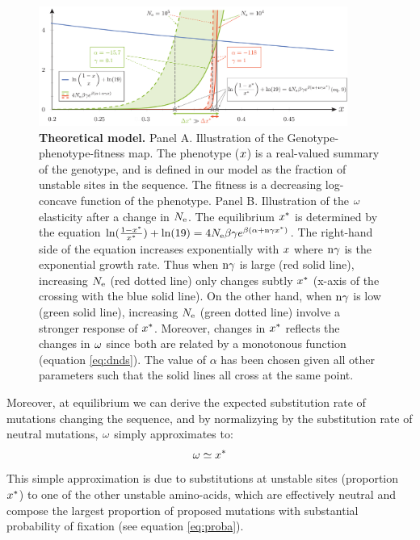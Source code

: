 \documentclass{article}
\begin{document}
\begin{figure}[htb!]
	\begin{mdframed}
		\centering
		\includegraphics[width=0.9\textwidth, page=1] {artworks/theoretical.pdf}
		\caption{
			\textbf{Theoretical model.}
			Panel A. Illustration of the Genotype-phenotype-fitness map. The phenotype ($x$) is a real-valued summary of the genotype, and is defined in our model as the fraction of unstable sites in the sequence. The fitness is a decreasing log-concave function of the phenotype.
			Panel B. Illustration of the $\omega$ elasticity after a change in $N_{\mathrm{e}}$. The equilibrium $x^{*}$ is determined by the equation $\ln(\frac{1 - x^{*}}{x^{*}}) + \ln(19)=4N_{\mathrm{e}} \beta \gamma e^{\beta (\alpha + \text{n} \gamma x^{*})}$. The right-hand side of the equation increases exponentially with $x$ where $\text{n} \gamma$ is the exponential growth rate. Thus when $\text{n} \gamma$ is large (red solid line), increasing $N_{\mathrm{e}}$ (red dotted line) only changes subtly $x^{*}$ (x-axis of the crossing with the blue solid line). On the other hand, when $\text{n} \gamma$ is low (green solid line), increasing $N_{\mathrm{e}}$ (green dotted line) involve a stronger response of $x^{*}$. Moreover, changes in $x^{*}$ reflects the changes in $\omega$ since both are related by a monotonous function (equation \ref{eq:dnds}). The value of $\alpha$ has been chosen given all other parameters such that the solid lines all cross at the same point.
		}
		\label{fig:NeChangeInfluence}
	\end{mdframed}
\end{figure}

Moreover, at equilibrium we can derive the expected substitution rate of mutations changing the sequence, and by normalizying by the substitution rate of neutral mutations, $\omega$ simply approximates to:
\begin{gather}
\omega \simeq x^{*} \label{eq:dnds}
\end{gather}
This simple approximation is due to substitutions at unstable sites (proportion $x^{*}$) to one of the other unstable amino-acids, which are effectively neutral and compose the largest proportion of proposed mutations with substantial probability of fixation (see equation \ref{eq:proba}).\\
\end{document}
